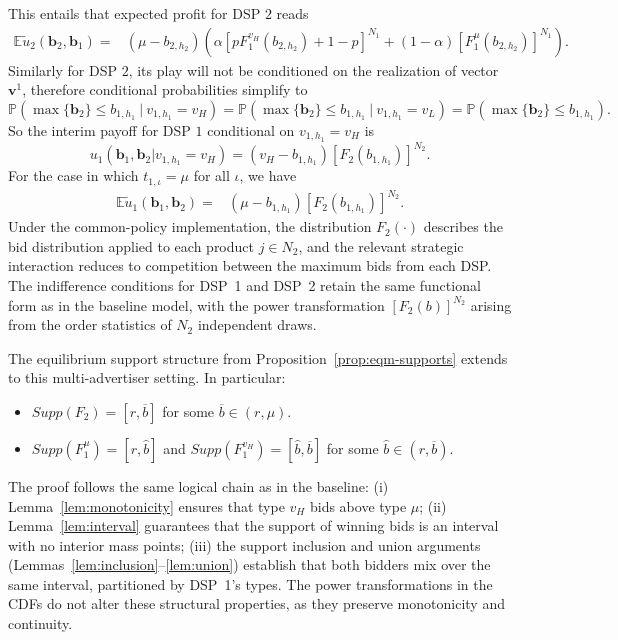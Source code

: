 \noindent This entails that expected profit for DSP $2$ reads
\begin{align*}
\mathbb{E} \tilde{u}_2 (\bm{b}_2, \bm{b}_1) = & \left(\mu - b_{2, h_2} \right) \left( \alpha \left[pF_1^{v_H}(b_{2,h_2}) + 1-p \right]^{N_1} + (1-\alpha) \left[F_1^{\mu}(b_{2,h_2})\right]^{N_1} \right).
\end{align*}
Similarly for DSP $2$, its play will not be conditioned on the realization of vector $\bm{v}^1$, therefore conditional probabilities simplify to
\begin{equation*}
    \mathbb{P}(\max \{ \bm{b}_2 \} \leq b_{1, h_1} \ | \ v_{1,h_1} = v_H) = \mathbb{P}(\max \{ \bm{b}_2 \} \leq b_{1, h_1} \ | \ v_{1,h_1} = v_L) = \mathbb{P}(\max \{ \bm{b}_2 \} \leq b_{1, h_1}).
\end{equation*}
So the interim payoff for DSP $1$ conditional on $v_{1,h_1} = v_H$ is
\begin{equation*}
    u_1(\bm{b}_1, \bm{b}_2 | v_{1,h_1} = v_H) = \left( v_H - b_{1,h_1} \right) \left[F_2(b_{1,h_1})\right]^{N_2}.
\end{equation*}
For the case in which $t_{1,\iota} = \mu$ for all $\iota$, we have
\begin{align*}
\mathbb{E} \tilde{u}_1 (\bm{b}_1, \bm{b}_2) = & (\mu - b_{1, h_1})\left[F_2(b_{1,h_1})\right]^{N_2}.
\end{align*}
Under the common-policy implementation, the distribution $F_2(\cdot)$ describes the bid distribution applied to each product $j \in N_2$, and the relevant strategic interaction reduces to competition between the maximum bids from each DSP. The indifference conditions for DSP~1 and DSP~2 retain the same functional form as in the baseline model, with the power transformation $[F_2(b)]^{N_2}$ arising from the order statistics of $N_2$ independent draws.

\begin{rem}\label{rem:multi-adv-structure}
The equilibrium support structure from Proposition~\ref{prop:eqm-supports} extends to this multi-advertiser setting. In particular:
\begin{itemize}
    \item[-] $Supp(F_2) = [r, \overline{b}]$ for some $\overline{b} \in (r, \mu)$.

    

    \item[-] $Supp(F_1^{\mu}) = [r, \hat{b}]$ and $Supp(F_1^{v_H}) = [\hat{b}, \overline{b}]$ for some $\hat{b} \in (r, \overline{b})$.
\end{itemize}

\noindent The proof follows the same logical chain as in the baseline: (i) Lemma~\ref{lem:monotonicity} ensures that type $v_H$ bids above type $\mu$; (ii) Lemma~\ref{lem:interval} guarantees that the support of winning bids is an interval with no interior mass points; (iii) the support inclusion and union arguments (Lemmas~\ref{lem:inclusion}--\ref{lem:union}) establish that both bidders mix over the same interval, partitioned by DSP~1's types. The power transformations in the CDFs do not alter these structural properties, as they preserve monotonicity and continuity.
\end{rem}

